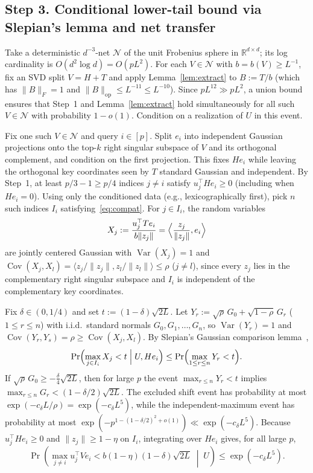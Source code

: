 \documentclass[11pt]{article}
\theoremstyle{plain}
\theoremstyle{definition}
\theoremstyle{remark}
\DeclareMathOperator{\Var}{Var}
\DeclareMathOperator{\Cov}{Cov}
\begin{document}
\subsection*{Step 3. Conditional lower-tail bound via Slepian's lemma and net transfer}

Take a deterministic $d^{-3}$-net $\mathcal{N}$ of the unit Frobenius sphere in $\mathbb{R}^{d \times d}$; its log cardinality is $O(d^2 \log d) = O(p L^2)$. For each $V \in \mathcal{N}$ with $b = b(V) \ge L^{-1}$, fix an SVD split $V = H + T$ and apply Lemma~\ref{lem:extract} to $B := T/b$ (which has $\|B\|_F = 1$ and $\|B\|_{\mathrm{op}} \le L^{-11} \le L^{-10}$). Since $p L^{12} \gg p L^2$, a union bound ensures that Step~1 and Lemma~\ref{lem:extract} hold simultaneously for all such $V \in \mathcal{N}$ with probability $1 - o(1)$. Condition on a realization of $U$ in this event.

Fix one such $V \in \mathcal{N}$ and query $i \in [p]$. Split $e_i$ into independent Gaussian projections onto the top-$k$ right singular subspace of $V$ and its orthogonal complement, and condition on the first projection. This fixes $H e_i$ while leaving the orthogonal key coordinates seen by $T$ standard Gaussian and independent. By Step~1, at least $p/3 - 1 \ge p/4$ indices $j \neq i$ satisfy $u_j^\top H e_i \ge 0$ (including when $H e_i = 0$). Using only the conditioned data (e.g., lexicographically first), pick $n$ such indices $I_i$ satisfying~\eqref{eq:compat}. For $j \in I_i$, the random variables
\[
X_j := \frac{u_j^\top T e_i}{b \|z_j\|} = \Bigl\langle \frac{z_j}{\|z_j\|}, e_i \Bigr\rangle
\]
are jointly centered Gaussian with $\Var(X_j) = 1$ and $\Cov(X_j, X_l) = \langle z_j/\|z_j\|, z_l/\|z_l\| \rangle \le \rho$ ($j \neq l$), since every $z_j$ lies in the complementary right singular subspace and $I_i$ is independent of the complementary key coordinates.

Fix $\delta \in (0, 1/4)$ and set $t := (1 - \delta)\sqrt{2L}$. Let $Y_r := \sqrt{\rho}\, G_0 + \sqrt{1 - \rho}\, G_r$ ($1 \le r \le n$) with i.i.d.\ standard normals $G_0, G_1, \dots, G_n$, so $\Var(Y_r) = 1$ and $\Cov(Y_r, Y_s) = \rho \ge \Cov(X_j, X_l)$. By Slepian's Gaussian comparison lemma~\cite{slepian1962},
\[
\Pr\Bigl(\max_{j \in I_i} X_j < t \;\Big|\; U, H e_i\Bigr) \le \Pr\Bigl(\max_{1 \le r \le n} Y_r < t\Bigr).
\]
If $\sqrt{\rho}\, G_0 \ge -\frac{\delta}{4}\sqrt{2L}$, then for large $p$ the event $\max_{r \le n} Y_r < t$ implies $\max_{r \le n} G_r < (1 - \delta/2)\sqrt{2L}$. The excluded shift event has probability at most $\exp(-c_\delta L/\rho) = \exp(-c_\delta L^5)$, while the independent-maximum event has probability at most $\exp(-p^{1 - (1-\delta/2)^2 + o(1)}) \ll \exp(-c_\delta L^5)$. Because $u_j^\top H e_i \ge 0$ and $\|z_j\| \ge 1 - \eta$ on $I_i$, integrating over $H e_i$ gives, for all large $p$,
\begin{equation}\label{eq:query-tail}
\Pr\!\left(\max_{j \neq i} u_j^\top V e_i < b(1 - \eta)(1 - \delta)\sqrt{2L} \;\middle|\; U\right)
\le \exp(-c_\delta L^5).
\end{equation}
\end{document}
